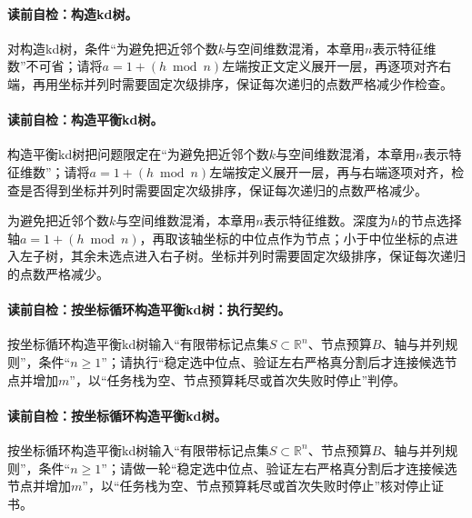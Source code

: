 \paragraph{读前自检：构造kd树。}对构造kd树，条件“为避免把近邻个数$k$与空间维数混淆，本章用$n$表示特征维数”不可省；请将$a=1+(h\bmod n)$左端按正文定义展开一层，再逐项对齐右端，再用坐标并列时需要固定次级排序，保证每次递归的点数严格减少作检查。\par
\paragraph{读前自检：构造平衡kd树。}构造平衡kd树把问题限定在“为避免把近邻个数$k$与空间维数混淆，本章用$n$表示特征维数”；请将$a=1+(h\bmod n)$左端按定义展开一层，再与右端逐项对齐，检查是否得到坐标并列时需要固定次级排序，保证每次递归的点数严格减少。\par

为避免把近邻个数$k$与空间维数混淆，本章用$n$表示特征维数。深度为$h$的节点选择轴$a=1+(h\bmod n)$，再取该轴坐标的中位点作为节点；小于中位坐标的点进入左子树，其余未选点进入右子树。坐标并列时需要固定次级排序，保证每次递归的点数严格减少。

\paragraph{读前自检：按坐标循环构造平衡kd树：执行契约。}按坐标循环构造平衡kd树输入“有限带标记点集$S\subset\mathbb R^n$、节点预算$B$、轴与并列规则”，条件“$n\ge1$”；请执行“稳定选中位点、验证左右严格真分割后才连接候选节点并增加$m$”，以“任务栈为空、节点预算耗尽或首次失败时停止”判停。\par
\paragraph{读前自检：按坐标循环构造平衡kd树。}按坐标循环构造平衡kd树输入“有限带标记点集$S\subset\mathbb R^n$、节点预算$B$、轴与并列规则”，条件“$n\ge1$”；请做一轮“稳定选中位点、验证左右严格真分割后才连接候选节点并增加$m$”，以“任务栈为空、节点预算耗尽或首次失败时停止”核对停止证书。\par

